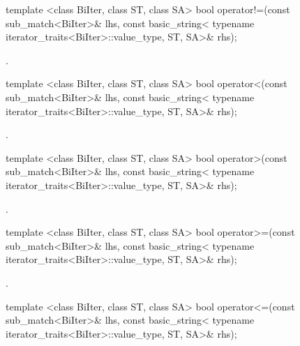 %
%
\begin{itemdecl}
template <class BiIter, class ST, class SA>
  bool operator!=(const sub_match<BiIter>& lhs,
                  const basic_string<
                    typename iterator_traits<BiIter>::value_type, ST, SA>& rhs);
\end{itemdecl}

\begin{itemdescr}
\pnum\returns  {}.
\end{itemdescr}

%
%
\begin{itemdecl}
template <class BiIter, class ST, class SA>
  bool operator<(const sub_match<BiIter>& lhs,
                 const basic_string<
                   typename iterator_traits<BiIter>::value_type, ST, SA>& rhs);
\end{itemdecl}

\begin{itemdescr}
\pnum\returns  {}.
\end{itemdescr}

%
\begin{itemdecl}
template <class BiIter, class ST, class SA>
  bool operator>(const sub_match<BiIter>& lhs,
                 const basic_string<
                   typename iterator_traits<BiIter>::value_type, ST, SA>& rhs);
\end{itemdecl}

\begin{itemdescr}
\pnum\returns  {}.
\end{itemdescr}

%
\begin{itemdecl}
template <class BiIter, class ST, class SA>
  bool operator>=(const sub_match<BiIter>& lhs,
                  const basic_string<
                    typename iterator_traits<BiIter>::value_type, ST, SA>& rhs);
\end{itemdecl}

\begin{itemdescr}
\pnum\returns  {}.
\end{itemdescr}

%
\begin{itemdecl}
template <class BiIter, class ST, class SA>
  bool operator<=(const sub_match<BiIter>& lhs,
                  const basic_string<
                    typename iterator_traits<BiIter>::value_type, ST, SA>& rhs);
\end{itemdecl}

